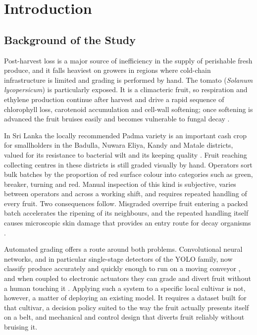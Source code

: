 \section{Introduction}
\label{ch:introduction}

\subsection{Background of the Study}
\label{sec:background}

Post-harvest loss is a major source of inefficiency in the supply of perishable fresh produce, and it falls heaviest on growers in regions where cold-chain infrastructure is limited and grading is performed by hand. The tomato (\textit{Solanum lycopersicum}) is particularly exposed. It is a climacteric fruit, so respiration and ethylene production continue after harvest and drive a rapid sequence of chlorophyll loss, carotenoid accumulation and cell-wall softening; once softening is advanced the fruit bruises easily and becomes vulnerable to fungal decay \citep{abekoon2024}.

In Sri Lanka the locally recommended Padma variety is an important cash crop for smallholders in the Badulla, Nuwara Eliya, Kandy and Matale districts, valued for its resistance to bacterial wilt and its keeping quality \citep{abekoon2024}. Fruit reaching collecting centres in these districts is still graded visually by hand. Operators sort bulk batches by the proportion of red surface colour into categories such as green, breaker, turning and red. Manual inspection of this kind is subjective, varies between operators and across a working shift, and requires repeated handling of every fruit. Two consequences follow. Misgraded overripe fruit entering a packed batch accelerates the ripening of its neighbours, and the repeated handling itself causes microscopic skin damage that provides an entry route for decay organisms \citep{abekoon2024}.

Automated grading offers a route around both problems. Convolutional neural networks, and in particular single-stage detectors of the \acrfull{YOLO} family, now classify produce accurately and quickly enough to run on a moving conveyor \citep{moya2025, terven2023}, and when coupled to electronic actuators they can grade and divert fruit without a human touching it \citep{geetha2025}. Applying such a system to a specific local cultivar is not, however, a matter of deploying an existing model. It requires a dataset built for that cultivar, a decision policy suited to the way the fruit actually presents itself on a belt, and mechanical and control design that diverts fruit reliably without bruising it.

